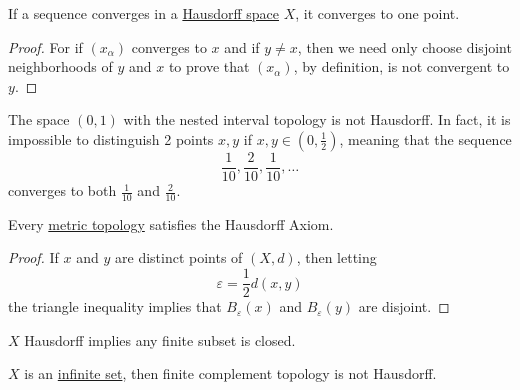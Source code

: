   \begin{theorem}
    \label{thm:unique-point-of-convergence}
    If a sequence converges in a \hyperref[def:hausdorff-space]{Hausdorff space} $X$, it converges to one point. 
  \end{theorem}
  \begin{proof}
    For if $(x_\alpha)$ converges to $x$ and if $y \neq x$, then we need only choose disjoint neighborhoods of $y$ and $x$ to prove that $(x_\alpha)$, by definition, is not convergent to $y$.
  \end{proof}

  \begin{example}
    \label{ex:the-nested-interval-topology-is-not-hausdorff}
    The space $(0,1)$ with the nested interval topology is not Hausdorff. In fact, it is impossible to distinguish 2 points $x, y$ if $x, y \in (0, \frac{1}{2})$, meaning that the sequence
    \begin{equation}
        \frac{1}{10}, \frac{2}{10}, \frac{1}{10}, \ldots
    \end{equation}
    converges to both $\frac{1}{10}$ and $\frac{2}{10}$.
  \end{example} 

  \begin{theorem}
    \label{thm:metric-topologies-are-hausdorff}
    Every \hyperref[def:metric-topology]{metric topology} satisfies the Hausdorff Axiom.
  \end{theorem}
  \begin{proof}
    If $x$ and $y$ are distinct points of $(X, d)$, then letting
    \begin{equation}
      \varepsilon = \frac{1}{2} d(x, y)
    \end{equation}
    the triangle inequality implies that $B_\varepsilon (x)$ and $B_\varepsilon (y)$ are disjoint. 
  \end{proof}

  \begin{lemma}
    \label{thm:finite-subsets-of-a-hausdorff-space-are-closed}
 
    $X$ Hausdorff implies any finite subset is closed. 
  \end{lemma}

  \begin{example}
    \label{ex:the-finite-complement-topology-is-not-hausdorff}
    $X$ is an \hyperref[st-def:infinite-set]{infinite set}, then finite complement topology is not Hausdorff. 
  \end{example} 

